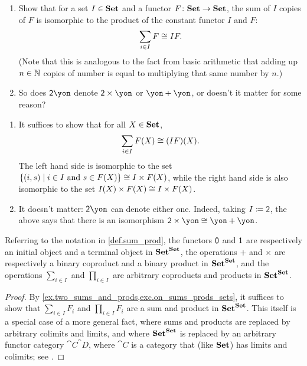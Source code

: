 \documentclass[Book-Poly]{subfiles}
\begin{document}
\begin{exercise} \label{exc.repeated_sum_is_product}
\begin{enumerate}
	\item Show that for a set $I \in \textbf{Set}$ and a functor $F \colon \textbf{Set} \to \textbf{Set}$, the sum of $I$ copies of $F$ is isomorphic to the product of the constant functor $I$ and $F$:
\[
    \sum_{i \in I} F \cong IF.
\]
(Note that this is analogous to the fact from basic arithmetic that adding up $n \in \mathbb{N}$ copies of number is equal to multiplying that same number by $n$.)
	\item So does $\2\yon$ denote $\2\times\yon$ or $\yon+\yon$, or doesn't it matter for some reason?
\qedhere
	\end{enumerate}
\begin{solution}
\begin{enumerate}
	\item It suffices to show that for all $X \in \textbf{Set}$,
  \[
      \sum_{i \in I} F(X) \cong (IF)(X).
  \]
  The left hand side is isomorphic to the set $\{(i,s)\mid i\in I\text{ and }s\in F(X)\} \cong I \times F(X)$, while the right hand side is also isomorphic to the set $I(X) \times F(X) \cong I \times F(X)$.
  \item It doesn't matter: $\2\yon$ can denote either one. Indeed, taking $I\coloneqq\textsf{2}$, the above says that there is an isomorphism $\2\times\yon\cong\yon+\yon$. 
\end{enumerate}
\end{solution}
\end{exercise}

\begin{proposition}
Referring to the notation in \cref{def.sum_prod}, the functors $\textsf{0}$ and $\textsf{1}$ are respectively an initial object and a terminal object in $\textbf{Set}^{\textbf{Set}}$, the operations $+$ and $\times$ are respectively a binary coproduct and a binary product in $\textbf{Set}^{\textbf{Set}}$, and the operations $\sum_{i\in I}$ and $\prod_{i\in I}$ are arbitrary coproducts and products in $\textbf{Set}^{\textbf{Set}}$.
\end{proposition}
\begin{proof}
By \cref{ex.two_sums_and_prods,exc.on_sums_prods_sets}, it suffices to show that $\sum_{i\in I}F_i$ and $\prod_{i\in I}F_i$ are a sum and product in $\textbf{Set}^{\textbf{Set}}$. This itself is a special case of a more general fact, where sums and products are replaced by arbitrary colimits and limits, and where $\textbf{Set}^{\textbf{Set}}$ is replaced by an arbitrary functor category $\cat{C}^\cat{D}$, where $\cat{C}$ is a category that (like $\textbf{Set}$) has limits and colimits; see \cite[page 22 -- 23, displays (24) and (25)]{macLane1992sheaves}.
\end{proof}
\end{document}
